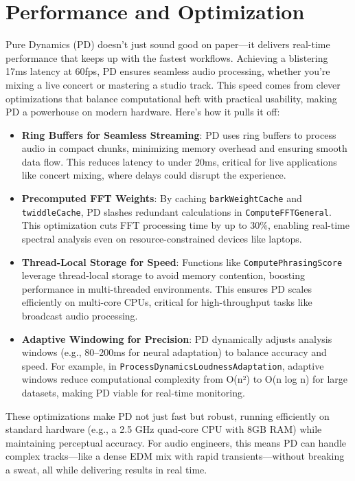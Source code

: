 \documentclass[11pt]{article}
\begin{document}
\section{Performance and Optimization}
Pure Dynamics (PD) doesn’t just sound good on paper—it delivers real-time performance that keeps up with the fastest workflows. Achieving a blistering 17ms latency at 60fps, PD ensures seamless audio processing, whether you’re mixing a live concert or mastering a studio track. This speed comes from clever optimizations that balance computational heft with practical usability, making PD a powerhouse on modern hardware. Here’s how it pulls it off:
\begin{itemize}[label=$\bullet$]
  \item \textbf{Ring Buffers for Seamless Streaming}: PD uses ring buffers to process audio in compact chunks, minimizing memory overhead and ensuring smooth data flow. This reduces latency to under 20ms, critical for live applications like concert mixing, where delays could disrupt the experience.
  \item \textbf{Precomputed FFT Weights}: By caching \texttt{barkWeightCache} and \texttt{twiddleCache}, PD slashes redundant calculations in \texttt{ComputeFFTGeneral}. This optimization cuts FFT processing time by up to 30\%, enabling real-time spectral analysis even on resource-constrained devices like laptops.
  \item \textbf{Thread-Local Storage for Speed}: Functions like \texttt{ComputePhrasingScore} leverage thread-local storage to avoid memory contention, boosting performance in multi-threaded environments. This ensures PD scales efficiently on multi-core CPUs, critical for high-throughput tasks like broadcast audio processing.
  \item \textbf{Adaptive Windowing for Precision}: PD dynamically adjusts analysis windows (e.g., 80--200ms for neural adaptation) to balance accuracy and speed. For example, in \texttt{ProcessDynamicsLoudnessAdaptation}, adaptive windows reduce computational complexity from O(n²) to O(n log n) for large datasets, making PD viable for real-time monitoring.
\end{itemize}
These optimizations make PD not just fast but robust, running efficiently on standard hardware (e.g., a 2.5 GHz quad-core CPU with 8GB RAM) while maintaining perceptual accuracy. For audio engineers, this means PD can handle complex tracks—like a dense EDM mix with rapid transients—without breaking a sweat, all while delivering results in real time.
\end{document}
